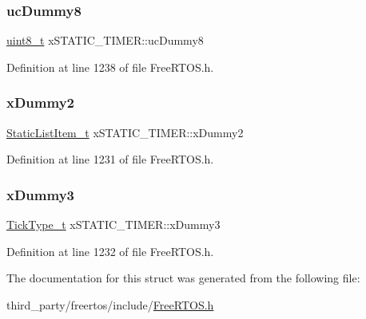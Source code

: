 \subsubsection{\texorpdfstring{uc\+Dummy8}{ucDummy8}}
{\footnotesize\ttfamily \hyperlink{stdint_8h_aba7bc1797add20fe3efdf37ced1182c5}{uint8\+\_\+t} x\+S\+T\+A\+T\+I\+C\+\_\+\+T\+I\+M\+E\+R\+::uc\+Dummy8}



Definition at line 1238 of file Free\+R\+T\+O\+S.\+h.

\mbox{\label{structxSTATIC__TIMER_a622e2e596e5829c9197bb44b9009474f}} 
\subsubsection{\texorpdfstring{x\+Dummy2}{xDummy2}}
{\footnotesize\ttfamily \hyperlink{FreeRTOS_8h_a1d31bc0472385a87424518da484d9e09}{Static\+List\+Item\+\_\+t} x\+S\+T\+A\+T\+I\+C\+\_\+\+T\+I\+M\+E\+R\+::x\+Dummy2}



Definition at line 1231 of file Free\+R\+T\+O\+S.\+h.

\mbox{\label{structxSTATIC__TIMER_a60d582d1d0b5b9b15e8050d5ae29bc30}} 
\subsubsection{\texorpdfstring{x\+Dummy3}{xDummy3}}
{\footnotesize\ttfamily \hyperlink{pic32mx_2portmacro_8h_aa69c48c6e902ce54f70886e6573c92a9}{Tick\+Type\+\_\+t} x\+S\+T\+A\+T\+I\+C\+\_\+\+T\+I\+M\+E\+R\+::x\+Dummy3}



Definition at line 1232 of file Free\+R\+T\+O\+S.\+h.



The documentation for this struct was generated from the following file\+:\begin{DoxyCompactItemize}
\item 
third\+\_\+party/freertos/include/\hyperlink{FreeRTOS_8h}{Free\+R\+T\+O\+S.\+h}\end{DoxyCompactItemize}
